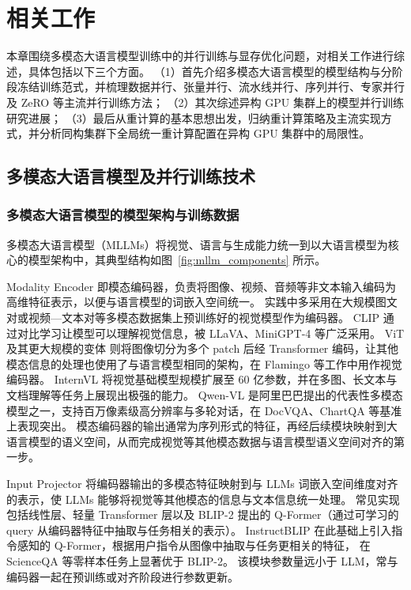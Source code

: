 \chapter{相关工作}

本章围绕多模态大语言模型训练中的并行训练与显存优化问题，对相关工作进行综述，具体包括以下三个方面。
（1）首先介绍多模态大语言模型的模型结构与分阶段冻结训练范式，并梳理数据并行、张量并行、流水线并行、序列并行、专家并行及 ZeRO 等主流并行训练方法；
（2）其次综述异构 GPU 集群上的模型并行训练研究进展；
（3）最后从重计算的基本思想出发，归纳重计算策略及主流实现方式，并分析同构集群下全局统一重计算配置在异构 GPU 集群中的局限性。


\section{多模态大语言模型及并行训练技术}

\subsection{多模态大语言模型的模型架构与训练数据}

多模态大语言模型（MLLMs）将视觉、语言与生成能力统一到以大语言模型为核心的模型架构中，其典型结构如图~\ref{fig:mllm_components} 所示。

Modality Encoder 即模态编码器，负责将图像、视频、音频等非文本输入编码为高维特征表示，以便与语言模型的词嵌入空间统一。
实践中多采用在大规模图文对或视频—文本对等多模态数据集上预训练好的视觉模型作为编码器。
CLIP\cite{clip2021} 通过对比学习让模型可以理解视觉信息，被 LLaVA\cite{llava2023}、MiniGPT-4\cite{minigpt4} 等广泛采用。
ViT\cite{vit2020} 及其更大规模的变体\cite{scaling_vit} 则将图像切分为多个 patch 后经 Transformer 编码，让其他模态信息的处理也使用了与语言模型相同的架构，在 Flamingo\cite{flamingo2022} 等工作中用作视觉编码器。
InternVL\cite{internvl2024} 将视觉基础模型规模扩展至 60 亿参数，并在多图、长文本与文档理解等任务上展现出极强的能力。
Qwen-VL\cite{qwenvl2023} 是阿里巴巴提出的代表性多模态模型之一，支持百万像素级高分辨率与多轮对话，在 DocVQA\cite{docvqa2021}、ChartQA\cite{chartqa2022} 等基准上表现突出。
模态编码器的输出通常为序列形式的特征，再经后续模块映射到大语言模型的语义空间，从而完成视觉等其他模态数据与语言模型语义空间对齐的第一步\cite{vision_language_pretrain_survey2024}。

Input Projector 将编码器输出的多模态特征映射到与 LLMs 词嵌入空间维度对齐的表示，使 LLMs 能够将视觉等其他模态的信息与文本信息统一处理。
常见实现包括线性层、轻量 Transformer 层以及 BLIP-2\cite{blip2} 提出的 Q-Former（通过可学习的 query 从编码器特征中抽取与任务相关的表示）。
InstructBLIP\cite{instructblip2023} 在此基础上引入指令感知的 Q-Former，根据用户指令从图像中抽取与任务更相关的特征，
在 ScienceQA\cite{scienceqa2022} 等零样本任务上显著优于 BLIP-2。
该模块参数量远小于 LLM，常与编码器一起在预训练或对齐阶段进行参数更新。

